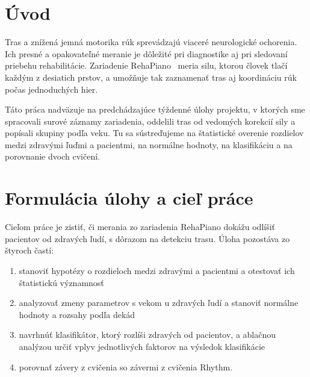 \documentclass[12pt,a4paper]{article}
\begin{document}
\clearpage
{}

\section*{Úvod}

Tras a znížená jemná motorika rúk sprevádzajú viaceré neurologické ochorenia. Ich presné a opakovateľné meranie je
dôležité pri diagnostike aj pri sledovaní priebehu rehabilitácie. Zariadenie RehaPiano~\cite{ferencik2020,esten}
meria silu, ktorou človek tlačí každým z desiatich prstov, a umožňuje tak zaznamenať tras aj koordináciu rúk počas
jednoduchých hier.

Táto práca nadväzuje na predchádzajúce týždenné úlohy projektu, v ktorých sme spracovali surové záznamy zariadenia,
oddelili tras od vedomých korekcií sily a popísali skupiny podľa veku. Tu sa sústreďujeme na štatistické overenie
rozdielov medzi zdravými ľuďmi a pacientmi, na normálne hodnoty, na klasifikáciu a na porovnanie dvoch cvičení.

\section{Formulácia úlohy a cieľ práce}
\label{sec:ciel}

Cieľom práce je zistiť, či merania zo zariadenia RehaPiano dokážu odlíšiť pacientov od zdravých ľudí, s dôrazom na
detekciu trasu. Úloha pozostáva zo štyroch častí:
\begin{enumerate}
  \item stanoviť hypotézy o rozdieloch medzi zdravými a pacientmi a otestovať ich štatistickú významnosť
  \item analyzovať zmeny parametrov s vekom u zdravých ľudí a stanoviť normálne hodnoty a rozsahy podľa dekád
  \item navrhnúť klasifikátor, ktorý rozlíši zdravých od pacientov, a ablačnou analýzou určiť vplyv jednotlivých
        faktorov na výsledok klasifikácie
  \item porovnať závery z cvičenia \ef{} so závermi z cvičenia Rhythm.
\end{enumerate}

\end{document}
